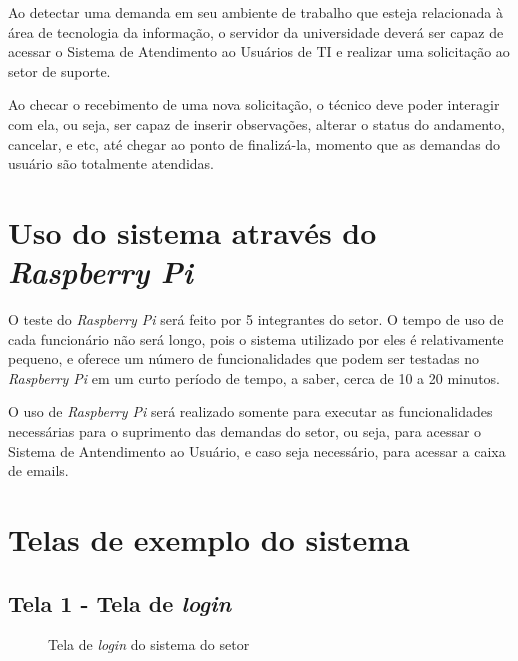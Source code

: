 Ao detectar uma demanda em seu ambiente de trabalho que esteja relacionada à área de tecnologia da informação, o servidor da universidade deverá ser capaz de acessar o Sistema de Atendimento ao Usuários de TI e realizar uma solicitação ao setor de suporte.

Ao checar o recebimento de uma nova solicitação, o técnico deve poder interagir com ela, ou seja, ser capaz de inserir observações, alterar o status do andamento, cancelar, e etc, até chegar ao ponto de finalizá-la, momento que as demandas do usuário são totalmente atendidas.

\section{Uso do sistema através do \textit{Raspberry Pi}}

O teste do \textit{Raspberry Pi} será feito por 5 integrantes do setor. O tempo de uso de cada funcionário não será longo, pois o sistema utilizado por eles é relativamente pequeno, e oferece um número de funcionalidades que podem ser testadas no \textit{Raspberry Pi} em um curto período de tempo, a saber, cerca de 10 a 20 minutos.

O uso de \textit{Raspberry Pi} será realizado somente para executar as funcionalidades necessárias para o suprimento das demandas do setor, ou seja, para acessar o Sistema de Antendimento ao Usuário, e caso seja necessário, para acessar a caixa de emails.

\section{Telas de exemplo do sistema}

\subsection{Tela 1 - Tela de \textit{login}}

\begin{figure}[ht]
    \centering
    \caption{Tela de \textit{login} do sistema do setor}
\end{figure}

